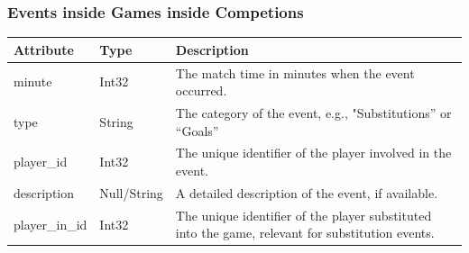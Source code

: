 \documentclass{Configuration_Files/PoliMi3i_thesis}
\begin{document}
\subsubsection{Events inside Games inside Competions}
\begin{tabular}{|l|l|p{8cm}|}
    \hline
    \rowcolor{bluepoli!40}
    \textbf{Attribute}   & \textbf{Type}         & \textbf{Description} \\ \hline
    minute               & Int32                 & The match time in minutes when the event occurred. \\ \hline
    type                 & String                & The category of the event, e.g., "Substitutions” or “Goals” \\ \hline
    player\_id           & Int32                 & The unique identifier of the player involved in the event. \\ \hline
    description          & Null/String           & A detailed description of the event, if available. \\ \hline
    player\_in\_id       & Int32                 & The unique identifier of the player substituted into the game, relevant for substitution events. \\ \hline
    \end{tabular}
\end{document}
